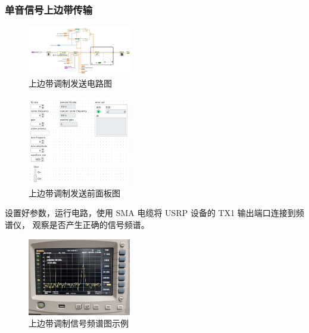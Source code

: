 \documentclass{../source/Experiment}
\begin{document}
        \subsubsection{单音信号上边带传输}
        \begin{figure}[H]
            \centering
            \includegraphics[width = 0.4\textwidth]{lab9/upper-side_IQ-a.jpg}
            \caption{上边带调制发送电路图}
        \end{figure}
        \begin{figure}[H]
            \centering
            \includegraphics[width = 0.4\textwidth]{lab9/upper-side_IQ-b.jpg}
            \caption{上边带调制发送前面板图}
        \end{figure}
        设置好参数，运行电路，使用 SMA 电缆将 USRP 设备的 TX1 输出端口连接到频谱仪， 观察是否产生正确的信号频谱。
        \begin{figure}[H]
            \centering
            \includegraphics[width = 0.4\textwidth,angle=180]{lab9/5.jpg}
            \caption{上边带调制信号频谱图示例}
        \end{figure}
\end{document}
